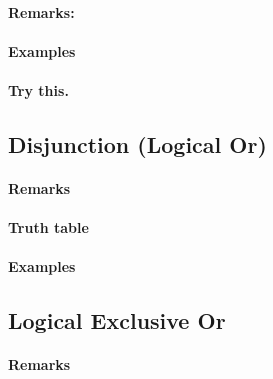 \documentclass[]{book}
\let\oldparagraph\paragraph
\renewcommand{\paragraph}[1]{\oldparagraph{#1}\mbox{}}
\theoremstyle{definition}
\theoremstyle{definition}
\theoremstyle{definition}
\theoremstyle{remark}
\begin{document}
\hypertarget{remarks-4}{%
\paragraph{Remarks:}\label{remarks-4}}

\hypertarget{examples-2}{%
\paragraph{Examples}\label{examples-2}}

\hypertarget{try-this.}{%
\paragraph{Try this.}\label{try-this.}}

\hypertarget{disjunction-logical-or}{%
\subsection*{Disjunction (Logical Or)}\label{disjunction-logical-or}}

\hypertarget{remarks-5}{%
\paragraph{Remarks}\label{remarks-5}}

\hypertarget{truth-table}{%
\paragraph{Truth table}\label{truth-table}}

\hypertarget{examples-3}{%
\paragraph{Examples}\label{examples-3}}

\hypertarget{logical-exclusive-or}{%
\subsection*{Logical Exclusive Or}\label{logical-exclusive-or}}

\hypertarget{remarks-6}{%
\paragraph{Remarks}\label{remarks-6}}
\end{document}
